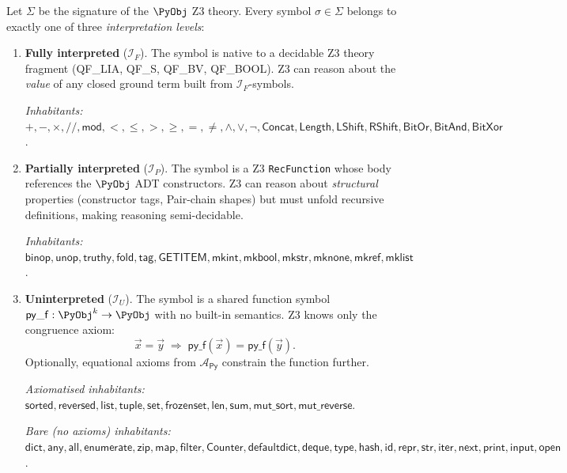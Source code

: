 \begin{definition}
\label{def:opacity-levels}
Let $\Sigma$ be the signature of the $\PyObj$ Z3 theory.  Every
symbol $\sigma\in\Sigma$ belongs to exactly one of three
\emph{interpretation levels}:
\begin{enumerate}[label=(\roman*)]
  \item \textbf{Fully interpreted} ($\mathcal{I}_F$).
    The symbol is native to a decidable Z3 theory fragment
    (QF\_LIA, QF\_S, QF\_BV, QF\_BOOL).
    Z3 can reason about the \emph{value} of any closed ground
    term built from $\mathcal{I}_F$-symbols.

    \emph{Inhabitants:}
    $+, -, \times, \mathsf{//}, \mathsf{mod},
     <, \leq, >, \geq, =, \neq,
     \land, \lor, \lnot,
     \mathsf{Concat}, \mathsf{Length},
     \mathsf{LShift}, \mathsf{RShift},
     \mathsf{BitOr}, \mathsf{BitAnd}, \mathsf{BitXor}$.

  \item \textbf{Partially interpreted} ($\mathcal{I}_P$).
    The symbol is a Z3 \texttt{RecFunction} whose body references
    the $\PyObj$ ADT constructors.  Z3 can reason about
    \emph{structural} properties (constructor tags, Pair-chain
    shapes) but must unfold recursive definitions, making reasoning
    semi-decidable.

    \emph{Inhabitants:}
    $\mathsf{binop}, \mathsf{unop}, \mathsf{truthy},
     \mathsf{fold}, \mathsf{tag},
     \mathsf{GETITEM},
     \mathsf{mkint}, \mathsf{mkbool}, \mathsf{mkstr},
     \mathsf{mknone}, \mathsf{mkref}, \mathsf{mklist}$.

  \item \textbf{Uninterpreted} ($\mathcal{I}_U$).
    The symbol is a shared function symbol
    $\mathsf{py\_f} : \PyObj^k \to \PyObj$ with no built-in
    semantics.  Z3 knows only the congruence axiom:
    \[
      \vec{x} = \vec{y}
      \;\Longrightarrow\;
      \mathsf{py\_f}(\vec{x}) = \mathsf{py\_f}(\vec{y}).
    \]
    Optionally, equational axioms from
    $\mathcal{A}_{\mathsf{Py}}$ constrain the function further.

    \emph{Axiomatised inhabitants:}
    $\mathsf{sorted}, \mathsf{reversed}, \mathsf{list},
     \mathsf{tuple}, \mathsf{set}, \mathsf{frozenset},
     \mathsf{len}, \mathsf{sum},
     \mathsf{mut\_sort}, \mathsf{mut\_reverse}$.

    \emph{Bare (no axioms) inhabitants:}
    $\mathsf{dict}, \mathsf{any}, \mathsf{all},
     \mathsf{enumerate}, \mathsf{zip}, \mathsf{map},
     \mathsf{filter}, \mathsf{Counter}, \mathsf{defaultdict},
     \mathsf{deque}, \mathsf{type}, \mathsf{hash}, \mathsf{id},
     \mathsf{repr}, \mathsf{str}, \mathsf{iter}, \mathsf{next},
     \mathsf{print}, \mathsf{input}, \mathsf{open}$.
\end{enumerate}
\end{definition}

